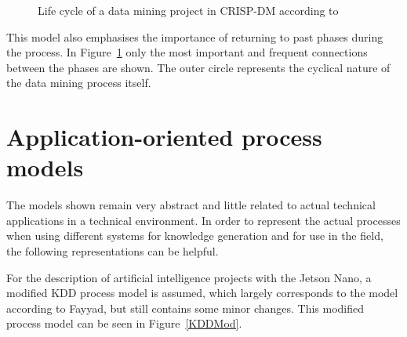 \begin{figure}[H]
\begin{center}
		\caption{Life cycle of a data mining project in CRISP-DM according to \cite{Chapman:2000}} 
		\label{CRISP-DM}
	\end{center}
\end{figure}

This model also emphasises the importance of returning to past phases during the process. In Figure~\ref{CRISP-DM} only the most important and frequent connections between the phases are shown. The outer circle represents the cyclical nature of the data mining process itself. \cite{Chapman:2000}

\section{Application-oriented process models}

The models shown remain very abstract and little related to actual technical applications in a technical environment. In order to represent the actual processes when using different systems for knowledge generation and for use in the field, the following representations can be helpful.

For the description of artificial intelligence projects with the Jetson Nano, a modified KDD process model is assumed, which largely corresponds to the model according to Fayyad, but still contains some minor changes. This modified process model can be seen in Figure~\ref{KDDMod}.

